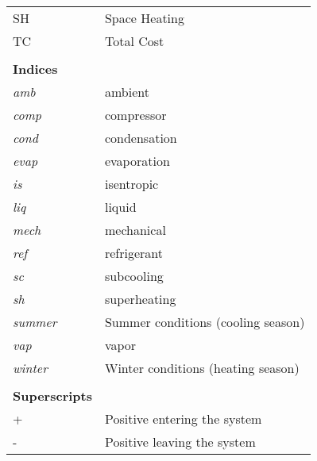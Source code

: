 \begin{table}[thp!]
\begin{tabular}{ll}
		SH & Space Heating \\
		TC & Total Cost \\
		&  \\
		\textbf{Indices} &  \\
		\textit{amb} & ambient \\
		\textit{comp} & compressor \\
		\textit{cond} & condensation \\
		\textit{evap} & evaporation \\
		\textit{is} & isentropic \\
		\textit{liq} & liquid \\
		\textit{mech} & mechanical \\
		\textit{ref} & refrigerant \\
		\textit{sc} & subcooling \\
		\textit{sh} & superheating \\
		\textit{summer} & Summer conditions (cooling season) \\
		\textit{vap} & vapor \\
		\textit{winter} & Winter conditions (heating season) \\
		&  \\
		\textbf{Superscripts} &  \\
		+ & Positive entering the system \\
		- & Positive leaving the system
	\end{tabular}
\end{table}